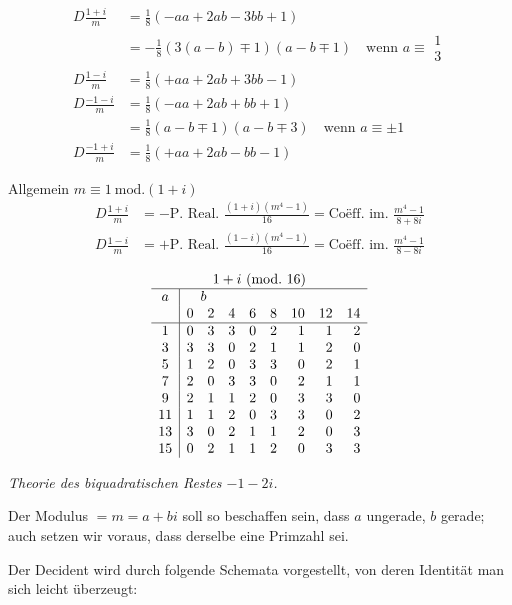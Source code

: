 \[
\begin{aligned}
D\frac{1+i}m&=\tfrac18(-aa+2ab-3bb+1)\\
&=-\tfrac18(3(a-b)\mp1)(a-b\mp1)\quad\text{wenn }a\equiv\substack{1\\3}\\
D\frac{1-i}m&=\tfrac18(+aa+2ab+3bb-1)\\
D\frac{-1-i}m&=\tfrac18(-aa+2ab+bb+1)\\
&=\tfrac18(a-b\mp1)(a-b\mp3)\quad\text{wenn }a\equiv\pm1\\
D\frac{-1+i}m&=\tfrac18(+aa+2ab-bb-1)
\end{aligned}
\]

%
Allgemein $m\equiv1\ \mathrm{mod.}(1+i)$
\[
\begin{aligned}
D\frac{1+i}m&=-\text{P. Real. }\frac{(1+i)(m^4-1)}{16}=\text{Coëff. im. }\frac{m^4-1}{8+8i}\\
D\frac{1-i}m&=+\text{P. Real. }\frac{(1-i)(m^4-1)}{16}=\text{Coëff. im. }\frac{m^4-1}{8-8i}
\end{aligned}
\]

\[
\begin{array}{c|rrrrrrrr}
\multicolumn{9}{c}{1+i\ (\mathrm{mod.}\ 16)}\\\hline
a&\multicolumn{8}{l}{\quad b}\\
&0&2&4&6&8&10&12&14\\\hline
1&0&3&3&0&2&1&1&2\\
3&3&3&0&2&1&1&2&0\\
5&1&2&0&3&3&0&2&1\\
7&2&0&3&3&0&2&1&1\\
9&2&1&1&2&0&3&3&0\\
11&1&1&2&0&3&3&0&2\\
13&3&0&2&1&1&2&0&3\\
15&0&2&1&1&2&0&3&3
\end{array}
\]

\begin{center}\emph{Theorie des biquadratischen Restes $-1-2i$.}\end{center}
Der Modulus $=m=a+bi$ soll so beschaffen sein, dass $a$ ungerade, $b$ gerade; auch setzen wir voraus, dass derselbe eine Primzahl sei.

Der Decident wird durch folgende Schemata vorgestellt, von deren Identität man sich leicht überzeugt:
\begin{center}\resizebox{\textwidth}{!}{}\end{center}

